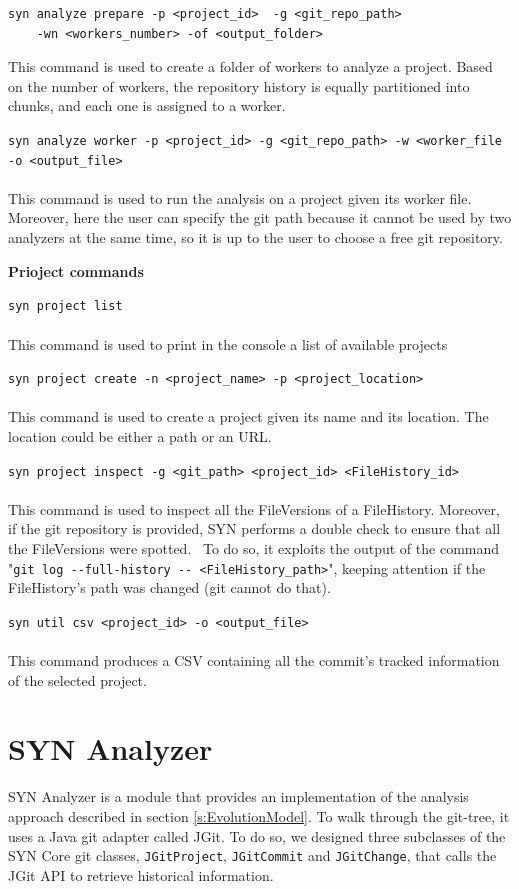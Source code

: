\begin{lstlisting}
syn analyze prepare -p <project_id>  -g <git_repo_path> 
    -wn <workers_number> -of <output_folder>
\end{lstlisting}
\bigbreak
This command is used to create a folder of workers to analyze a project.
Based on the number of workers, the repository history is equally partitioned into chunks, and each one is assigned to a worker. 
\bigbreak

\lstinline{syn analyze worker -p <project_id> -g <git_repo_path> -w <worker_file -o <output_file>}\\
\\
This command is used to run the analysis on a project given its worker file. 
Moreover, here the user can specify the git path because it cannot be used by two analyzers at the same time, so it is up to the user to choose a free git repository. 

\bigbreak
\textbf{Prioject commands}
\bigbreak

\lstinline{syn project list}\\
\\
This command is used to print in the console a list of available projects

\bigbreak
\lstinline{syn project create -n <project_name> -p <project_location>}\\
\\
This command is used to create a project given its name and its location. The location could be either a path or an URL. 

\bigbreak
\lstinline{syn project inspect -g <git_path> <project_id> <FileHistory_id>}\\
\\
This command is used to inspect all the FileVersions of a FileHistory. Moreover, if the git repository is provided, SYN performs a double check to ensure that all the FileVersions were spotted. \
To do so, it exploits the output of the command "\lstinline{git log --full-history -- <FileHistory_path>}", keeping attention if the FileHistory's path was changed (git cannot do that).

\bigbreak
\lstinline{syn util csv <project_id> -o <output_file>}\\
\\
This command produces a CSV containing all the commit's tracked information of the selected project. 


\section{SYN Analyzer}
SYN Analyzer is a module that provides an implementation of the analysis approach described in section \ref{s:EvolutionModel}.
To walk through the git-tree, it uses a Java git adapter called JGit. 
To do so, we designed three subclasses of the SYN Core git classes, \texttt{JGitProject}, \texttt{JGitCommit} and \texttt{JGitChange}, that calls the JGit API to retrieve historical information. 
\bigbreak

